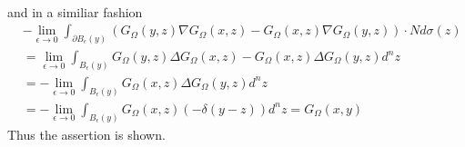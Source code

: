 \documentclass[A4,12pt,twoside]{book}
\begin{document}
{\begin{align*}
     \end{align*}
     and in a similiar fashion 
     \begin{align*}
       &- \lim_{\epsilon \to 0} \int_{\partial B_\epsilon (y)} (G_\Omega (y,z)\nabla G_\Omega (x,z)-G_\Omega (x,z) \nabla G_\Omega (y,z)) \cdot N d \sigma (z)\\
       &= \lim_{\epsilon \to 0} \int_{ B_\epsilon (y)} G_\Omega (y,z)\Delta G_\Omega (x,z)-G_\Omega (x,z) \Delta G_\Omega (y,z)  d^n z\\
       &=- \lim_{\epsilon \to 0} \int_{B_\epsilon (y)} G_\Omega (x,z) \Delta G_\Omega (y,z)  d^n z \\
       &= - \lim_{\epsilon \to 0} \int_{B_\epsilon (y)}  G_\Omega(x,z) (-\delta (y-z))  d^n z =  G_\Omega(x,y) 
     \end{align*}
     Thus the assertion is shown.
}
\end{document}
